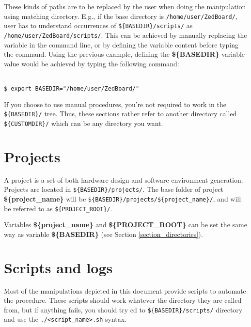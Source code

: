 \documentclass[openany,a4paper]{book}
\begin{document}
These kinds of paths are to be replaced by the user when doing the manipulation using matching directory.
E.g., if the base directory is \nolinkurl{/home/user/ZedBoard/}, user has to understand occurrences of \nolinkurl{${BASEDIR}/scripts/} as \nolinkurl{/home/user/ZedBoard/scripts/}.
This can be achieved by manually replacing the variable in the command line, or by defining the variable content before typing the command.
Using the previous example, defining the \textbf{\$\{BASEDIR\}} variable value would be achieved by typing the following command:

\begin{tabbing}
\kill \hspace{1cm} \= \\
\> \texttt{\$ export BASEDIR="/home/user/ZedBoard/"} \\
\end{tabbing}

If you choose to use manual procedures, you're not required to work in the \nolinkurl{${BASEDIR}/} tree.
Thus, these sections rather refer to another directory called \nolinkurl{${CUSTOMDIR}/} which can be any directory you want.


\section{Projects}

A project is a set of both hardware design and software environment generation.
Projects are located in \nolinkurl{${BASEDIR}/projects/}.
The base folder of project \textbf{\$\{project\_name\}} will be \nolinkurl{${BASEDIR}/projects/${project\_name}/}, and will be referred to as \nolinkurl{${PROJECT_ROOT}/}.

Variables \textbf{\$\{project\_name\}} and \textbf{\$\{PROJECT\_ROOT\}} can be set the same way as variable \textbf{\$\{BASEDIR\}} (see Section \ref{section_directories}).


\section{Scripts and logs}

Most of the manipulations depicted in this document provide scripts to automate the procedure.
These scripts should work whatever the directory they are called from, but if anything fails, you should try cd to \nolinkurl{${BASEDIR}/scripts/} directory and use the \nolinkurl{./<script_name>.sh} syntax.
\end{document}
